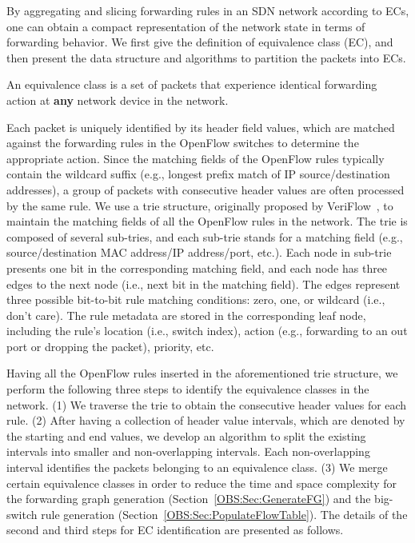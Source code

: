 
\label{OBS:Sec:IdentifyEC}
By aggregating and slicing forwarding rules in an SDN network according to ECs, one can obtain a compact representation of the network state in terms of forwarding behavior.
We first give the definition of equivalence class (EC), and then present the data structure and algorithms to partition the packets into ECs.
\begin{definition}
    An equivalence class is a set of packets that experience identical forwarding action at \textbf{any} network device in the network.
    \label{OBS:Def:EC}
\end{definition}

Each packet is uniquely identified by its header field values, which are matched against the forwarding rules in the OpenFlow switches
to determine the appropriate action.
Since the matching fields of the OpenFlow rules typically contain the wildcard suffix (e.g., longest prefix match of IP source/destination addresses), a group of packets with consecutive header values are often processed by the same rule.
We use a trie structure, originally proposed by VeriFlow~\cite{Veriflow}, to maintain the matching fields of all the OpenFlow rules in the network.
The trie is composed of several sub-tries, and each sub-trie stands for a matching field (e.g., source/destination MAC address/IP address/port, etc.).
Each node in sub-trie presents one bit in the corresponding matching field, and each node has three edges to the next node (i.e., next bit in the  matching field).
The edges represent three possible bit-to-bit rule matching conditions: zero, one, or wildcard (i.e., don't care).
The rule metadata are stored in the corresponding leaf node, including the rule's location (i.e., switch index),
action (e.g., forwarding to an out port or dropping the packet), priority, etc.

Having all the OpenFlow rules inserted in the aforementioned trie structure,
we perform the following three steps to identify the equivalence classes in the network.
(1) We traverse the trie to obtain the consecutive header values for each rule.
(2) After having a collection of header value intervals, which are denoted by the starting and end values,
we develop an algorithm to split the existing intervals into smaller and non-overlapping intervals.
Each non-overlapping interval identifies the packets belonging to an equivalence class.
(3) We merge certain equivalence classes in order to reduce the time and space complexity for the forwarding graph generation
(Section~\ref{OBS:Sec:GenerateFG}) and the big-switch rule generation (Section~\ref{OBS:Sec:PopulateFlowTable}).
The details of the second and third steps for EC identification are presented as follows.

